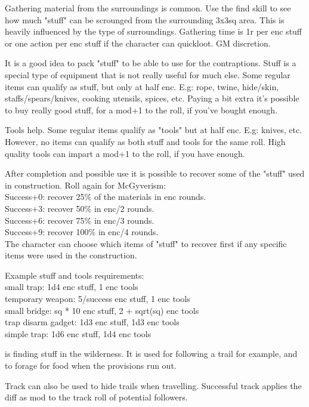 Gathering material from the surroundings is common. Use the find skill to see how much "stuff" can be scrounged from the surrounding 3x3sq area. This is heavily influenced by the type of surroundings. Gathering time is 1r per enc stuff or one action per enc stuff if the character can quickloot. GM discretion.

It is a good idea to pack "stuff" to be able to use for the contraptions. Stuff is a special type of equipment that is not really useful for much else. Some regular items can qualify as stuff, but only at half enc. E.g: rope, twine, hide/skin, staffs/spears/knives, cooking utensils, spices, etc. Paying a bit extra it's possible to buy really good stuff, for a mod+1 to the roll, if you've bought enough.

Tools help. Some regular items qualify as "tools" but at half enc. E.g: knives, etc. However, no items can qualify as both stuff and tools for the same roll. High quality tools can impart a mod+1 to the roll, if you have enough.

After completion and possible use it is possible to recover some of the "stuff" used in construction. Roll again for McGyverism: \\
Success+0: recover 25\% of the materials in enc rounds. \\
Success+3: recover 50\% in enc/2 rounds. \\
Success+6: recover 75\% in enc/3 rounds. \\
Success+9: recover 100\% in enc/4 rounds. \\
The character can choose which items of "stuff" to recover first if any specific items were used in the construction.

Example stuff and tools requirements: \\
small trap: 1d4 enc stuff, 1 enc tools \\
temporary weapon: 5/success enc stuff, 1 enc tools \\
small bridge: sq * 10 enc stuff, 2 + sqrt(sq) enc tools \\
trap disarm gadget: 1d3 enc stuff, 1d3 enc tools \\
simple trap: 1d6 enc stuff, 1d4 enc tools


 is finding stuff in the wilderness. It is used for following a trail for example, and to forage for food when the provisions run out.

Track can also be used to hide trails when travelling. Successful track applies the diff as mod to the track roll of potential followers.

